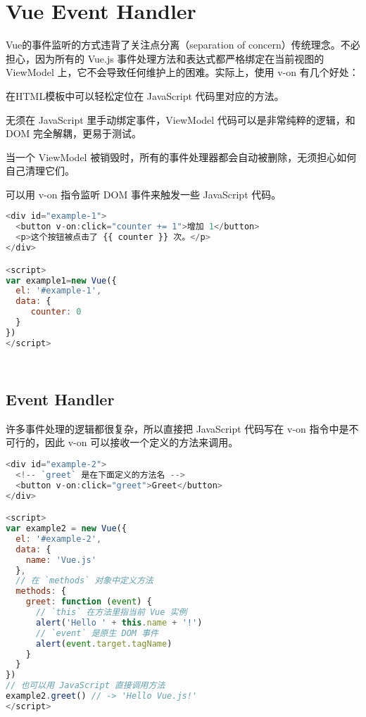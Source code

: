 \chapter{Vue Event Handler}

Vue的事件监听的方式违背了关注点分离（separation of concern）传统理念。不必担心，因为所有的 Vue.js 事件处理方法和表达式都严格绑定在当前视图的 ViewModel 上，它不会导致任何维护上的困难。实际上，使用 v-on 有几个好处：

\begin{compactitem}
\item 在HTML模板中可以轻松定位在 JavaScript 代码里对应的方法。

\item 无须在 JavaScript 里手动绑定事件，ViewModel 代码可以是非常纯粹的逻辑，和 DOM 完全解耦，更易于测试。
\item 当一个 ViewModel 被销毁时，所有的事件处理器都会自动被删除，无须担心如何自己清理它们。
\end{compactitem}

可以用 v-on 指令监听 DOM 事件来触发一些 JavaScript 代码。


\begin{lstlisting}[language=JavaScript]
<div id="example-1">
  <button v-on:click="counter += 1">增加 1</button>
  <p>这个按钮被点击了 {{ counter }} 次。</p>
</div>

<script>
var example1=new Vue({
  el: '#example-1',
  data: {
     counter: 0
  }
})
</script>
\end{lstlisting}



\begin{lstlisting}[language=JavaScript]

\end{lstlisting}



\begin{lstlisting}[language=JavaScript]

\end{lstlisting}

\section{Event Handler}

许多事件处理的逻辑都很复杂，所以直接把 JavaScript 代码写在 v-on 指令中是不可行的，因此 v-on 可以接收一个定义的方法来调用。

\begin{lstlisting}[language=JavaScript]
<div id="example-2">
  <!-- `greet` 是在下面定义的方法名 -->
  <button v-on:click="greet">Greet</button>
</div>

<script>
var example2 = new Vue({
  el: '#example-2',
  data: {
    name: 'Vue.js'
  },
  // 在 `methods` 对象中定义方法
  methods: {
    greet: function (event) {
      // `this` 在方法里指当前 Vue 实例
      alert('Hello ' + this.name + '!')
      // `event` 是原生 DOM 事件
      alert(event.target.tagName)
    }
  }
})
// 也可以用 JavaScript 直接调用方法
example2.greet() // -> 'Hello Vue.js!'
</script>
\end{lstlisting}



